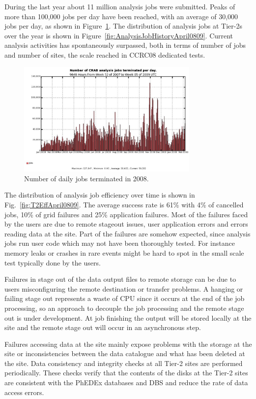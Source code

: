 During the last year about 11 million analysis jobs were submitted.  Peaks
of more than 100,000 jobs per day have been reached, with an average
of 30,000 jobs per day, as shown in Figure~\ref{fig:jobs}.
The distribution of analysis jobs at Tier-2s over the year is shown in Figure~\ref{fig:AnalysisJobHistoryApril0809}. Current analysis activities has spontaneously surpassed, both in terms of number of jobs and number of sites, the scale reached in CCRC08 dedicated tests. 
\begin{figure}
\includegraphics[width=3.5in]{crabjobsdaily.eps}
\caption{Number of daily jobs terminated in 2008. }
\label{fig:jobs}
\end{figure}

The distribution of analysis job efficiency over time is shown in Fig.~\ref{fig:T2EffApril0809}. The average success rate is 61\% with 4\% of cancelled jobs, 10\% of grid failures and 25\% application failures.
Most of the failures faced by the users are due to remote stageout issues, user application errors and errors reading data at the site. 
Part of the failures are somehow expected, since analysis jobs run user code which may not have been thoroughly tested. For instance memory leaks or crashes in rare events might be hard to spot in the small scale test typically done by the users.

Failures in stage out of the data output files to remote storage can be due 
to users misconfiguring the remote destination or transfer problems.
A hanging or failing stage out represents a waste of CPU since it occurs at 
the end of the job processing, so an approach to decouple the job processing and the remote stage out is under development. At job finishing the output will be stored locally at the site and the remote stage out will occur in an asynchronous step.

Failures accessing data at the site mainly expose problems with the storage at the site or inconsistencies between the data catalogue and what has been deleted at the site. 
Data consistency and integrity checks at all Tier-2 sites are performed periodically. These checks verify that the contents of the disks at the Tier-2 sites are consistent with the PhEDEx databases and DBS and reduce the rate of data access errors.

